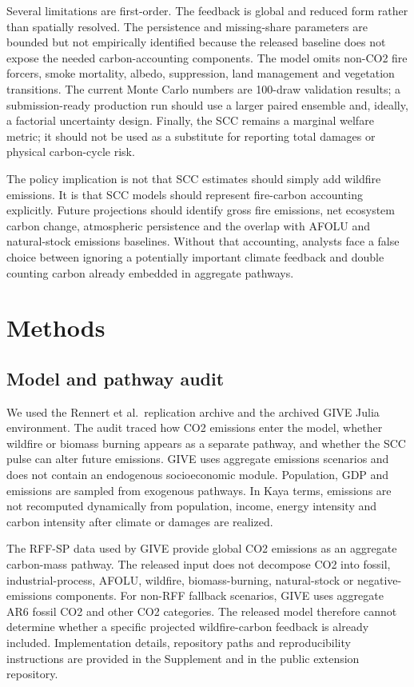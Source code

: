 \documentclass[12pt]{article}
\begin{document}
Several limitations are first-order. The feedback is global and reduced
form rather than spatially resolved. The persistence and missing-share
parameters are bounded but not empirically identified because the
released baseline does not expose the needed carbon-accounting
components. The model omits non-CO2 fire forcers, smoke mortality,
albedo, suppression, land management and vegetation transitions. The
current Monte Carlo numbers are 100-draw validation results; a
submission-ready production run should use a larger paired ensemble and,
ideally, a factorial uncertainty design. Finally, the SCC remains a
marginal welfare metric; it should not be used as a substitute for
reporting total damages or physical carbon-cycle risk.

The policy implication is not that SCC estimates should simply add
wildfire emissions. It is that SCC models should represent fire-carbon
accounting explicitly. Future projections should identify gross fire
emissions, net ecosystem carbon change, atmospheric persistence and the
overlap with AFOLU and natural-stock emissions baselines. Without that
accounting, analysts face a false choice between ignoring a potentially
important climate feedback and double counting carbon already embedded
in aggregate pathways.

\section{Methods}\label{methods}

\subsection{Model and pathway audit}\label{model-and-pathway-audit}

We used the Rennert et al.~replication archive and the archived GIVE
Julia environment. The audit traced how CO2 emissions enter the model,
whether wildfire or biomass burning appears as a separate pathway, and
whether the SCC pulse can alter future emissions. GIVE uses aggregate
emissions scenarios and does not contain an endogenous socioeconomic
module. Population, GDP and emissions are sampled from exogenous
pathways. In Kaya terms, emissions are not recomputed dynamically from
population, income, energy intensity and carbon intensity after climate
or damages are realized.

The RFF-SP data used by GIVE provide global CO2 emissions as an
aggregate carbon-mass pathway. The released input does not decompose CO2
into fossil, industrial-process, AFOLU, wildfire, biomass-burning,
natural-stock or negative-emissions components. For non-RFF fallback
scenarios, GIVE uses aggregate AR6 fossil CO2 and other CO2 categories.
The released model therefore cannot determine whether a specific
projected wildfire-carbon feedback is already included. Implementation
details, repository paths and reproducibility instructions are provided
in the Supplement and in the public extension repository.
\end{document}
